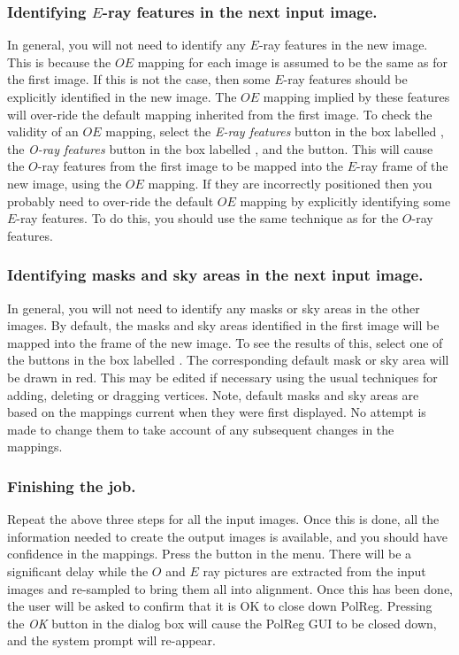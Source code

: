 \subsubsection {Identifying $E$-ray features in the next input image.}
In general, you will not need to identify any $E$-ray features in the new
image. This is because the $OE$ mapping for each image is assumed to be
the same as for the first image. If this is not the case, then some
$E$-ray features should be explicitly identified in the new image. The
$OE$ mapping implied by these features will over-ride the default mapping
inherited from the first image. To check the validity of an $OE$
mapping, select the {\em E-ray features} button in the box labelled
, the {\em O-ray features} button in
the box labelled , and the 
 button. This will cause
the $O$-ray features from the first image to be mapped into the $E$-ray
frame of the new image, using the $OE$ mapping. If they are incorrectly
positioned then you probably need to over-ride the default $OE$ mapping
by explicitly identifying some $E$-ray features. To do this, you should
use the same technique as for the $O$-ray features.

\subsubsection {Identifying masks and sky areas in the next input image.}
In general, you will not need to identify any masks or sky areas in the
other images. By default, the masks and sky areas identified in the first
image will be mapped into the frame of the new image. To see the results
of this, select one of the buttons in the box labelled
. The corresponding default mask
or sky area will be drawn in red. This may be edited if necessary using the
usual techniques for adding, deleting or dragging vertices. Note, 
default masks and sky areas are based on the mappings current when they
were first displayed. No attempt is made to change them to take
account of any subsequent changes in the mappings.

\subsubsection {Finishing the job.}
Repeat the above three steps for all the input images. Once this is done,
all the information needed to create the output images is available, and
you should have confidence in the mappings. Press the  button in the 
menu. There will be a significant delay while the $O$ and $E$ ray
pictures are extracted from the input images and re-sampled to bring them
all into alignment. Once this has been done, the user will be asked to
confirm that it is OK to close down PolReg. Pressing the {\em OK} button
in the dialog box will cause the PolReg GUI to be closed down, and the 
system prompt will re-appear.

